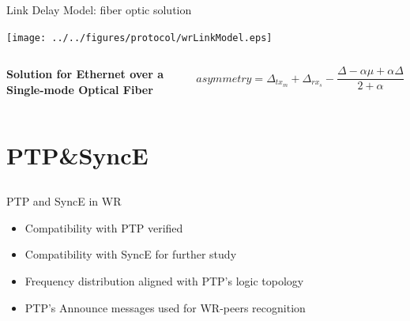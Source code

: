 \documentclass[compress,red]{beamer}
\begin{document}
\begin{frame}{Link Delay Model: fiber optic solution}

  \begin{center}
  \texttt{[image: ../../figures/protocol/wrLinkModel.eps]}
  \end{center}

  \begin{columns}[c]
  \column{1.5in}

    \begin{center}
      \textbf{Solution for Ethernet over a Single-mode Optical Fiber}
    \end{center}    

  \column{2.7in}

    \begin{equation}
      \nonumber asymmetry = \Delta_{tx_m} + \Delta_{rx_s} - \frac{\Delta - \alpha \mu + \alpha \Delta}{2 + \alpha}
    \end{equation}

  \end{columns}

\end{frame}
\section{PTP\&SyncE}
\subsection{}
\begin{frame}{PTP and SyncE in WR}

  \begin{itemize}
    \item Compatibility with PTP verified
    \item Compatibility with SyncE for further study
    \item Frequency distribution aligned with PTP's logic topology
    \item PTP's Announce messages used for WR-peers recognition
  \end{itemize}

\end{frame}
\end{document}

